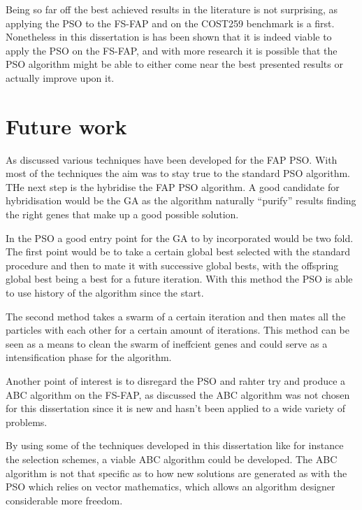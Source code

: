 Being so far off the best achieved results in the literature is not surprising, as applying the PSO to the FS-FAP and on the COST259 benchmark is a first. Nonetheless in this dissertation is has been shown that it is indeed viable to apply the PSO on the FS-FAP, and with more research it is possible that the PSO algorithm might be able to either come near the best presented results or actually improve upon it.

\section{Future work}
As discussed various techniques have been developed for the FAP PSO. With most of the techniques the aim was to stay true to the standard PSO algorithm. THe next step is the hybridise the FAP PSO algorithm. A good candidate for hybridisation would be the GA as the algorithm naturally ``purify'' results finding the right genes that make up a good possible solution.

In the PSO a good entry point for the GA to by incorporated would be two fold. The first point would be to take a certain global best selected with the standard procedure and then to mate it with successive global bests, with the offspring global best being a best for a future iteration. With this method the PSO is able to use history of the algorithm since the start.

The second method takes a swarm of a certain iteration and then mates all the particles with each other for a certain amount of iterations. This method can be seen as a means to clean the swarm of ineffcient genes and could serve as a intensification phase for the algorithm.

Another point of interest is to disregard the PSO and rahter try and produce a ABC algorithm on the FS-FAP, as discussed the ABC algorithm was not chosen for this dissertation since it is new and hasn't been applied to a wide variety of problems. 

By using some of the techniques developed in this dissertation like for instance the selection schemes, a viable ABC algorithm could be developed. The ABC algorithm is not that specific as to how new solutions are generated as with the PSO which relies on vector mathematics, which allows an algorithm designer considerable more freedom.





